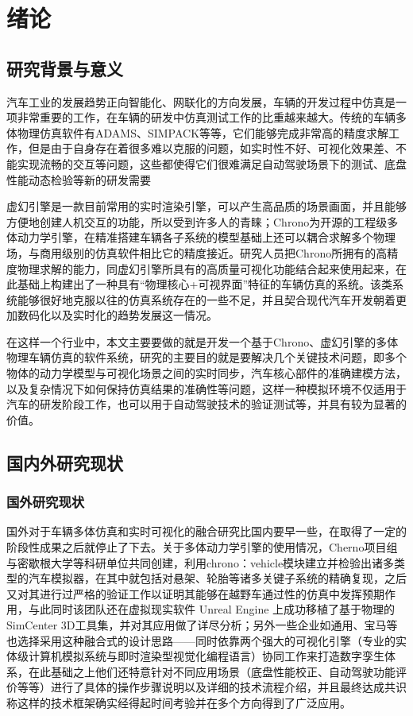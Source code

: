 

\chapter{绪论}
\section{研究背景与意义}
汽车工业的发展趋势正向智能化、网联化的方向发展，车辆的开发过程中仿真是一项非常重要的工作，在车辆的研发中仿真测试工作的比重越来越大。传统的车辆多体物理仿真软件有ADAMS、SIMPACK等等\cite{gao2026suspension}，它们能够完成非常高的精度求解工作，但是由于自身存在着很多难以克服的问题，如实时性不好、可视化效果差、不能实现流畅的交互等问题，这些都使得它们很难满足自动驾驶场景下的测试、底盘性能动态检验等新的研发需要

虚幻引擎是一款目前常用的实时渲染引擎，可以产生高品质的场景画面，并且能够方便地创建人机交互的功能，所以受到许多人的青睐；Chrono为开源的工程级多体动力学引擎，在精准搭建车辆各子系统的模型基础上还可以耦合求解多个物理场，与商用级别的仿真软件相比它的精度接近\cite{wang2026auv}。研究人员把Chrono所拥有的高精度物理求解的能力，同虚幻引擎所具有的高质量可视化功能结合起来使用起来，在此基础上构建出了一种具有“物理核心+可视界面”特征的车辆仿真的系统。该类系统能够很好地克服以往的仿真系统存在的一些不足，并且契合现代汽车开发朝着更加数码化以及实时化的趋势发展这一情况。

在这样一个行业中，本文主要要做的就是开发一个基于Chrono、虚幻引擎的多体物理车辆仿真的软件系统，研究的主要目的就是要解决几个关键技术问题，即多个物体的动力学模型与可视化场景之间的实时同步，汽车核心部件的准确建模方法，以及复杂情况下如何保持仿真结果的准确性等问题，这样一种模拟环境不仅适用于汽车的研发阶段工作，也可以用于自动驾驶技术的验证测试等，并具有较为显著的价值\cite{chai2026trajectory}。

\section{国内外研究现状}

\subsection{国外研究现状}

国外对于车辆多体仿真和实时可视化的融合研究比国内要早一些，在取得了一定的阶段性成果之后就停止了下去。关于多体动力学引擎的使用情况，Cherno项目组与密歇根大学等科研单位共同创建，利用chrono：vehicle模块建立并检验出诸多类型的汽车模拟器，在其中就包括对悬架、轮胎等诸多关键子系统的精确复现，之后又对其进行过严格的验证工作以证明其能够在越野车通过性的仿真中发挥预期作用，与此同时该团队还在虚拟现实软件 Unreal Engine 上成功移植了基于物理的SimCenter 3D工具集，并对其应用做了详尽分析\cite{li2026carfollowing}；另外一些企业如通用、宝马等也选择采用这种融合式的设计思路——同时依靠两个强大的可视化引擎（专业的实体级计算机模拟系统与即时渲染型视觉化编程语言）协同工作来打造数字孪生体系，在此基础之上他们还特意针对不同应用场景（底盘性能校正、自动驾驶功能评价等等）进行了具体的操作步骤说明以及详细的技术流程介绍，并且最终达成共识称这样的技术框架确实经得起时间考验并在多个方向得到了广泛应用。

